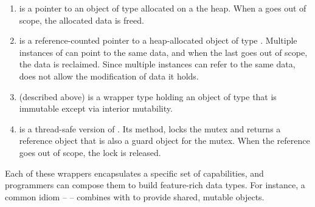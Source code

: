 \begin{enumerate}

\item {} is a pointer to an object of type  allocated on a
  the heap.  When a  goes out of scope, the allocated data is
  freed.
  
\item {} is a reference-counted pointer to a heap-allocated object of type
  .  Multiple instances of
   can point to the same data, and when the last  goes
  out of scope, the data is reclaimed.  Since multiple
   instances can refer to the same data,  does not allow
  the modification of data it holds.

\item {} (described above) is a wrapper type holding an object of type  that
  is immutable except via interior mutability.

\item {} is a thread-safe version of .  Its
   method, locks the mutex and returns a reference object that is
  also a guard object for the mutex.  When the reference goes out of scope, the
  lock is released.
  


  
\end{enumerate}

Each of these wrappers encapsulates a specific set of capabilities, and
programmers can compose them to build feature-rich data types.  For instance, a
common idiom --  -- combines 
with  to provide shared, mutable objects.


